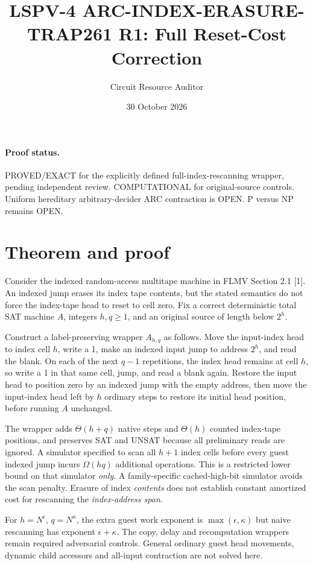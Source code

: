 \documentclass[11pt]{article}
\title{LSPV-4 ARC-INDEX-ERASURE-TRAP261 R1: Full Reset-Cost Correction}
\author{Circuit Resource Auditor}
\date{30 October 2026}
\begin{document}
\maketitle

\paragraph{Proof status.}
PROVED/EXACT for the explicitly defined full-index-rescanning wrapper, pending independent review. COMPUTATIONAL for original-source controls. Uniform hereditary arbitrary-decider ARC contraction is OPEN. P versus NP remains OPEN.

\section*{Theorem and proof}
Consider the indexed random-access multitape machine in FLMV Section 2.1 [1]. An indexed jump erases its index tape contents, but the stated semantics do not force the index-tape head to reset to cell zero. Fix a correct deterministic total SAT machine $A$, integers $h,q\ge1$, and an original source of length below $2^h$.

Construct a label-preserving wrapper $A_{h,q}$ as follows. Move the input-index head to index cell $h$, write a 1, make an indexed input jump to address $2^h$, and read the blank. On each of the next $q-1$ repetitions, the index head remains at cell $h$, so write a 1 in that same cell, jump, and read a blank again. Restore the input head to position zero by an indexed jump with the empty address, then move the input-index head left by $h$ ordinary steps to restore its initial head position, before running $A$ unchanged.

The wrapper adds $\Theta(h+q)$ native steps and $\Theta(h)$ counted index-tape positions, and preserves SAT and UNSAT because all preliminary reads are ignored. A simulator specified to scan all $h+1$ index cells before every guest indexed jump incurs $\Omega(hq)$ additional operations. This is a restricted lower bound on that simulator \emph{only}. A family-specific cached-high-bit simulator avoids the scan penalty. Erasure of index \emph{contents} does not establish constant amortized cost for rescanning the \emph{index-address span}.

For $h=N^\epsilon$, $q=N^\kappa$, the extra guest work exponent is $\max(\epsilon,\kappa)$ but naive rescanning has exponent $\epsilon+\kappa$. The copy, delay and recomputation wrappers remain required adversarial controls. General ordinary guest head movements, dynamic child accessors and all-input contraction are not solved here.
\end{document}

